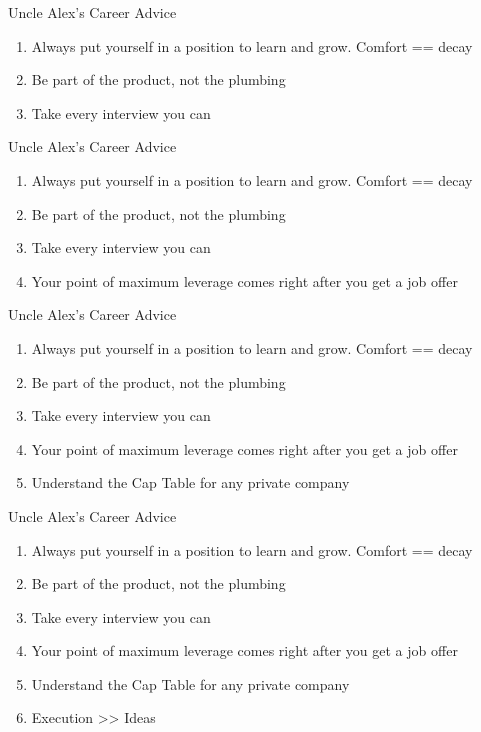\documentclass[nobackground,dvipsnames,table,aspectratio=169]{beamer}
\begin{document}
\begin{frame}{Uncle Alex's Career Advice}
    \begin{enumerate}
        \item Always put yourself in a position to learn and grow. Comfort == decay
        \item Be part of the product, not the plumbing
        \item Take every interview you can
    \end{enumerate}
\end{frame}

\begin{frame}{Uncle Alex's Career Advice}
    \begin{enumerate}
        \item Always put yourself in a position to learn and grow. Comfort == decay
        \item Be part of the product, not the plumbing
        \item Take every interview you can
        \item Your point of maximum leverage comes right after you get a job offer
    \end{enumerate}
\end{frame}

\begin{frame}{Uncle Alex's Career Advice}
    \begin{enumerate}
        \item Always put yourself in a position to learn and grow. Comfort == decay
        \item Be part of the product, not the plumbing
        \item Take every interview you can
        \item Your point of maximum leverage comes right after you get a job offer
        \item Understand the Cap Table for any private company
    \end{enumerate}
\end{frame}

\begin{frame}{Uncle Alex's Career Advice}
    \begin{enumerate}
        \item Always put yourself in a position to learn and grow. Comfort == decay
        \item Be part of the product, not the plumbing
        \item Take every interview you can
        \item Your point of maximum leverage comes right after you get a job offer
        \item Understand the Cap Table for any private company
        \item Execution >> Ideas
    \end{enumerate}
\end{frame}
\end{document}
